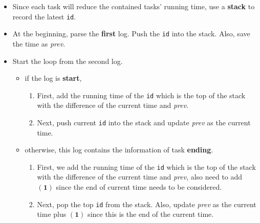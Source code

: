 \documentclass[a4paper,12pt]{article}
\begin{document}
\begin{itemize}
	\item Since each task will reduce the contained tasks' running time, use a \textbf{stack} to record the latest \texttt{id}.
	\item At the beginning, parse the \textbf{first} log. Push the \texttt{id} into the stack. Also, save the time as \textit{prev}.
	\item Start the loop from the second log.
	\begin{itemize}
		\item if the log is \textbf{start}, 
		\begin{enumerate}
			\item First, add the running time of the \texttt{id} which is the top of the stack with the difference of the current time and \textit{prev}.
			\item Next, push current \texttt{id} into the stack and update \textit{prev} as the current time.
		\end{enumerate}
		\item otherwise, this log contains the information of task \textbf{ending}.
		\begin{enumerate}
			\item First, we add the running time of the  \texttt{id} which is the top of the stack with the difference of the current time and \textit{prev}, also need to add $\mathbf{(1)}$ since the end of current time needs to be considered.
			\item Next, pop the top \texttt{id} from the stack. Also, update \textit{prev} as the current time plus $\mathbf{(1)}$ since this is the end of the current time.
		\end{enumerate}
	\end{itemize}
\end{itemize}
\end{document}
